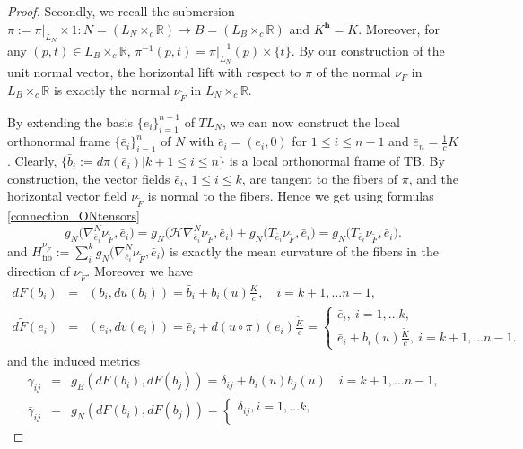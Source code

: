 \documentclass[12pt]{article}
\numberwithin{lemma}{section}
\newcommand{\R}{\mathbb{R}}
\newcommand{\h}{\mathbf{h}}
\begin{document}
{\begin{proof}
Secondly, we recall the submersion $\pi:=\pi|_{L_N}\times 1:N=(L_N\times_c \R)\rightarrow B=(L_B\times_c \R)$ and $K^{\h}=\tilde{K}$. %
Moreover, for any $(p,t)\in L_B\times_c \R$, $\pi^{-1}(p,t)=\pi|_{L_N}^{-1}(p)\times\{t\}$.
By our construction of the unit normal vector, the horizontal lift with respect to $\pi$ of the normal $\nu_{F}$ in $L_B\times_c\R$ is exactly the normal $\nu_{\widetilde{F}}$ in $L_N\times_c \R$. 

By extending the basis $\{e_i\}_{i=1}^{n-1}$ of $TL_N$, we can now construct the local orthonormal frame $\{\bar{e}_i\}_{i=1}^{n}$  of $N$ with $\bar{e}_i=(e_i,0)$ for $1\leq i\leq n-1$ and $\bar{e}_{n}=\frac{1}{c}K$. 
Clearly, $\{\bar{b}_i:=d\pi(\bar{e}_i) \vert k+1\leq i\leq n\}$ is a local orthonormal frame of TB. 
By construction, the vector fields $\bar{e}_i$, $1\leq i\leq k$, are tangent to the fibers of $\pi$, and the horizontal vector field $\nu_{\widetilde{F}}$ is normal to the fibers. Hence we get using formulas \eqref{connection_ONtensors}
\[ g_{N} \big( \nabla_{\bar{e}_i}^{N} \nu_{{\widetilde{F}}},\bar{e}_i\big) = 
g_{N}\big( \mathcal{H}\nabla_{\bar{e}_i}^{N} \nu_{\widetilde{F}},\bar{e}_i\big)+g_{N}\big( T_{\bar{e}_i}\nu_{\widetilde{F}},\bar{e}_i\big)=g_{N}\big( T_{\bar{e}_i}\nu_{\widetilde{F}},\bar{e}_i\big).
\]
and $H_{\mathrm{fib}}^{\nu_{\widetilde{F}}}:=\sum_i^kg_{N}\big( \nabla_{\bar{e}_i}^{N} \nu_{{\widetilde{F}}},\bar{e}_i\big)$ is exactly the mean curvature  of the fibers in the direction of $\nu_{\widetilde{F}}$. 
Moreover we have 
\begin{eqnarray*}
dF(b_i)&=&(b_i,du(b_i))=\bar{b}_i+b_i(u)\frac{K}{c},\quad i=k+1,\dots n-1,\\
d\widetilde{F}({e}_i)&=&({e}_i,dv({e}_i))=\bar{e}_i+d(u\circ\pi)(e_i)\frac{\widetilde{K}}{c}=
\begin{cases}\bar{e}_i,\ i=1,\dots k,\\
\bar{e}_i+b_i(u)\frac{\widetilde{K}}{c}, \ i=k+1,\dots n-1.
\end{cases}
\end{eqnarray*}
and the induced metrics 
\begin{eqnarray}\label{metrics_immersionsB_N}
\gamma_{ij}&=&g_{B}(dF(b_i),dF(b_j))=\delta_{ij}+b_i(u)b_j(u)\quad i=k+1,\dots n-1,\nonumber\\
\bar{\gamma}_{ij}&=&g_{N}(dF(b_i),dF(b_j))=
\begin{cases}\delta_{ij}, i=1,\dots k,\\

\end{cases}
\end{eqnarray}
\end{proof}}
\end{document}
